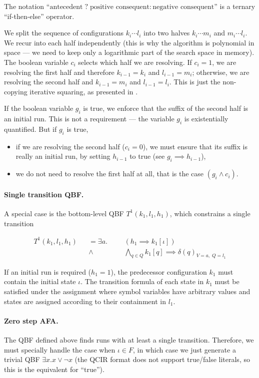 \documentclass{article}
\begin{document}
The notation ``$\text{antecedent} \;?\; \text{positive consequent} : \text{negative consequent}$'' is a ternary ``if-then-else'' operator.

We split the sequence of configurations $k_i \cdots l_i$ into two halves $k_i \cdots m_i$ and $m_i \cdots l_i$.
We recur into each half independently (this is why the algorithm is polynomial in space --- we need to keep only a logarithmic part of the search space in memory).
The boolean variable $c_i$ selects which half we are resolving. If $c_i=1$, we are resolving the first half and therefore $k_{i-1} = k_i$ and $l_{i-1} = m_i$; otherwise, we are resolving the second half and $k_{i-1} = m_i$ and $l_{i-1} = l_i$. This is just the non-copying iterative squaring, as presented in \cite{bmc2qbf}.

If the boolean variable $g_i$ is true, we enforce that the suffix of the second half is an initial run.
This is not a requirement --- the variable $g_i$ is existentially quantified.
But if $g_i$ is true,
\begin{itemize}
\item if we are resolving the second half ($c_i = 0$), we must ensure that its suffix is really an initial run, by setting $h_{i-1}$ to true (see $g_i \implies h_{i-1}$),
\item we do not need to resolve the first half at all, that is the case $(g_i \land c_i)$.
\end{itemize}

\paragraph{Single transition QBF.}
A special case is the bottom-level QBF $T^1(k_1, l_1, h_1)$, which constrains a single transition

\[
\begin{aligned}
  T^1(k_1, l_1, h_1) &&= \exists a. &&& (h_1 \implies k_1[\iota]) \\
  && \land &&& \bigwedge_{q \in Q} k_1[q] \implies \delta(q)_{V = a,\; Q = l_1} 
\end{aligned}
\]

If an initial run is required ($h_1 = 1$), the predecessor configuration $k_1$ must contain the initial state $\iota$. The transition formula of each state in $k_1$ must be satisfied under the assignment where symbol variables have arbitrary values and states are assigned according to their containment in $l_1$.

\paragraph{Zero step AFA.}
The QBF defined above finds runs with at least a single transition. Therefore, we must specially handle the case when $\iota \in F$, in which case we just generate a trivial QBF $\exists x. x \lor \neg x$ (the QCIR format does not support true/false literals, so this is the equivalent for ``true'').
\end{document}
